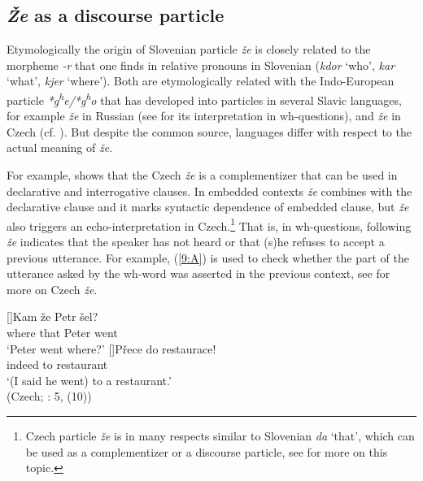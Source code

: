 \documentclass[output=paper,modfonts,newtxmath,hidelinks]{langscibook}
\begin{document}
\subsection{\textit{Že} as a discourse particle}

Etymologically the origin of Slovenian particle \textit{že} is closely related to the morpheme \textit{-r} that one finds in relative pronouns in Slovenian (\textit{kdor} `who', \textit{kar} `what', \textit{kjer} `where'). Both are etymologically related with the Indo-European particle \textit{*g\textsuperscript{h}e/*g\textsuperscript{h}o} that has developed into particles in several Slavic languages, for example \textit{že} in Russian (see \citealt{hagstrommccoy2003} for its interpretation in wh-questions), and \textit{že} in Czech \citep{skrabalova2012} (cf. \citealt{mitrovic2016benj}). But despite the common source, languages differ with respect to the actual meaning of \textit{že}.\enlargethispage{8pt}

For example, \cite{skrabalova2012} shows that the Czech \textit{že} is a complementizer that can be used in declarative and interrogative clauses. In embedded contexts \textit{že} combines with the declarative clause and it marks syntactic dependence of embedded clause, but \textit{že} also triggers an echo-interpretation in Czech.\footnote{Czech particle \textit{že} is in many respects similar to Slovenian \textit{da} `that', which can be used as a complementizer or a discourse particle, see \cite{marusicetal2015} for more on this topic.} That is, in wh-questions, following \cite{skrabalova2012} \textit{že} indicates that the speaker has not heard or that (s)he refuses to accept a previous utterance. For example, (\ref{9:A}) is used to check whether the part of the utterance asked by the wh-word was asserted in the previous context, see \cite{skrabalova2012} for more on Czech \textit{že}.

\begin{exe} 
\ex\label{9:A}
\begin{xlist}
[]{\gll Kam  že Petr šel?\\
 	 where that Peter went\\
\glt `Peter went where?'}
[]{\gll Přece do restaurace! \\
	 indeed to restaurant \\
\glt `(I said he went) to a restaurant.'\\
\hfill (Czech; \citealt{skrabalova2012}: 5, (10))}
\end{xlist}
\end{exe}
\end{document}
